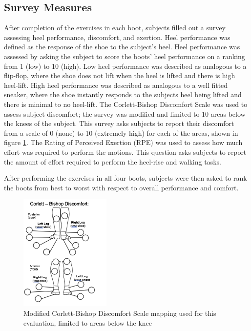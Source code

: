 \documentclass[defaultstyle,11pt]{comps}
\begin{document}
\hypertarget{survey-measures}{%
\subsection{Survey Measures}\label{survey-measures}}

After completion of the exercises in each boot, subjects filled out a survey assessing heel performance, discomfort, and exertion.
Heel performance was defined as the response of the shoe to the subject's heel.
Heel performance was assessed by asking the subject to score the boots' heel performance on a ranking from 1 (low) to 10 (high).
Low heel performance was described as analogous to a flip-flop, where the shoe does not lift when the heel is lifted and there is high heel-lift.
High heel performance was described as analogous to a well fitted sneaker, where the shoe instantly responds to the subjects heel being lifted and there is minimal to no heel-lift.
The Corlett-Bishop Discomfort Scale \citep{Corlett1976} was used to assess subject discomfort; the survey was modified and limited to 10 areas below the knees of the subject.
This survey asks subjects to report their discomfort from a scale of 0 (none) to 10 (extremely high) for each of the areas, shown in figure \ref{fig:SA4-CB}.
The Rating of Perceived Exertion (RPE) \citep{Borg1982} was used to assess how much effort was required to perform the motions.
This question asks subjects to report the amount of effort required to perform the heel-rise and walking tasks.

After performing the exercises in all four boots, subjects were then asked to rank the boots from best to worst with respect to overall performance and comfort.

\begin{figure}
\hypertarget{fig:SA4-CB}{%
\centering
\includegraphics[width=0.4\textwidth,height=\textheight]{../fig/SA4/Corlett-Bishop.png}
\caption{Modified Corlett-Bishop Discomfort Scale mapping used for this evaluation, limited to areas below the knee}\label{fig:SA4-CB}
}
\end{figure}
\end{document}

